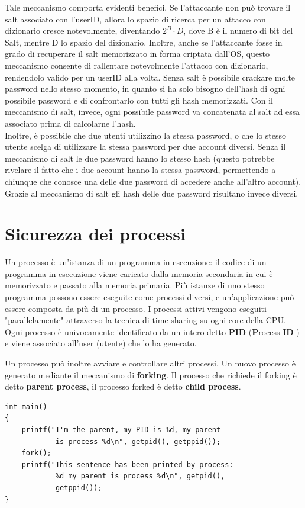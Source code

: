 Tale meccanismo comporta evidenti benefici. Se l'attaccante non può trovare il salt associato con l'userID, allora lo spazio di ricerca per un attacco con dizionario cresce notevolmente, diventando $2^{B} \cdot D$, dove B è il numero di bit del Salt, mentre D lo spazio del dizionario. \newline
Inoltre, anche se l'attaccante fosse in grado di recuperare il salt memorizzato in forma criptata dall'OS, questo meccanismo consente di rallentare notevolmente l'attacco con dizionario, rendendolo valido per un userID alla volta. Senza salt è possibile crackare molte password nello stesso momento, in quanto si ha solo bisogno dell'hash di ogni possibile password e di confrontarlo con tutti gli hash memorizzati. Con il meccanismo di salt, invece, ogni possibile password va
concatenata al salt ad essa associato prima di calcolarne l'hash.\\

Inoltre, è possibile che due utenti utilizzino la stessa password, o che lo stesso utente scelga di utilizzare la stessa password per due account diversi. Senza il meccanismo di salt le due password hanno lo stesso hash (questo potrebbe rivelare il fatto che i due account hanno la stessa password, permettendo a chiunque che conosce una delle due password di accedere anche all'altro account). Grazie al meccanismo di salt gli hash delle due password risultano invece diversi.

\section{Sicurezza dei processi}
Un processo è un'istanza di un programma in esecuzione: il codice di un programma in esecuzione viene caricato dalla memoria secondaria in cui è memorizzato e passato alla memoria primaria. Più istanze di uno stesso programma possono essere eseguite come processi diversi, e un'applicazione può essere composta da più di un processo.  I processi attivi vengono eseguiti "parallelamente" attraverso la tecnica di time-sharing su ogni core della CPU. Ogni processo è univocamente identificato da un intero detto \textbf{PID} (\textbf{P}rocess \textbf{ID} ) e viene associato all'user (utente) che lo ha generato. \newline 

Un processo può inoltre avviare e controllare altri processi. Un nuovo processo è generato mediante il meccanismo di \textbf{forking}. Il processo che richiede il forking è detto \textbf{parent process}, il processo forked è detto \textbf{child process}.
\begin{algorithm}
\begin{lstlisting}[caption={Esempio forking in C}]
int main()
{
	printf("I'm the parent, my PID is %d, my parent 
			is process %d\n", getpid(), getppid());
	fork();
	printf("This sentence has been printed by process:
	 		%d my parent is process %d\n", getpid(), 
	 		getppid());
}
\end{lstlisting}
\end{algorithm}
